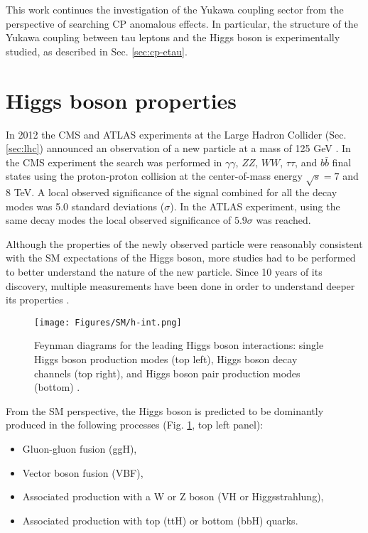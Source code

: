 This work continues the investigation of the Yukawa coupling sector from the perspective of searching CP anomalous effects. In particular, the structure of the Yukawa coupling between tau leptons and the Higgs boson is experimentally studied, as described in Sec. \ref{sec:cp-etau}.

\section{Higgs boson properties}\label{sec:higgs}

In 2012 the CMS and ATLAS experiments at the Large Hadron Collider (Sec. \ref{sec:lhc}) announced an observation of a new particle at a mass of 125 GeV \cite{ATLAS:2012yve, CMS:2012qbp}. In the CMS experiment the search was performed in $\gamma\gamma$, $ZZ$, $WW$, $\tau\tau$, and $b\bar{b}$ final states using the proton-proton collision at the center-of-mass energy $\sqrt{s} = 7$ and $8$ TeV. A local observed significance of the signal combined for all the decay modes was 5.0 standard deviations ($\sigma$). In the ATLAS experiment, using the same decay modes the local observed significance of $5.9\sigma$ was reached. 

Although the properties of the newly observed particle were reasonably consistent with the SM expectations of the Higgs boson, more studies had to be performed to better understand the nature of the new particle. Since 10 years of its discovery, multiple measurements have been done in order to understand deeper its properties \cite{CMS:2022dwd, ATLAS:2022vkf}.  

\begin{figure}[!h]
    \centering
    \texttt{[image: Figures/SM/h-int.png]}
    \caption{Feynman diagrams for the leading Higgs boson interactions: single Higgs boson production modes (top left), Higgs boson decay channels (top right), and Higgs boson pair production modes (bottom) \cite{Mulders:2019vhb}.}
    \label{fig:h-int}
\end{figure}

From the SM perspective, the Higgs boson is predicted to be dominantly produced in the following processes (Fig. \ref{fig:h-int}, top left panel): 
\begin{itemize}
    \item Gluon-gluon fusion (ggH),
    \item Vector boson fusion (VBF),
    \item Associated production with a W or Z boson (VH or Higgsstrahlung),
    \item Associated production with top (ttH) or bottom (bbH) quarks.
\end{itemize}

